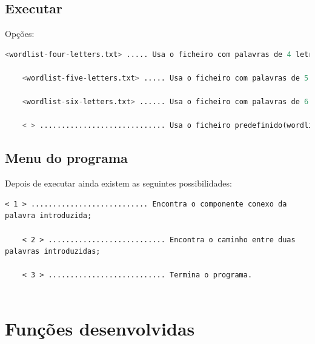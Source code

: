 	\section{Executar}
	\label{executar}
	Opções:
	\begin{lstlisting}[language=python]
	<wordlist-four-letters.txt> ..... Usa o ficheiro com palavras de 4 letras;
	
	<wordlist-five-letters.txt> ..... Usa o ficheiro com palavras de 5 letras;
	
	<wordlist-six-letters.txt> ...... Usa o ficheiro com palavras de 6 letras;
	
	< > ............................. Usa o ficheiro predefinido(wordlist-big-latest.txt).
	\end{lstlisting}
\pagebreak
	\section{Menu do programa}
	\label{menu}
	Depois de executar ainda existem as seguintes possibilidades:
	\begin{lstlisting}[]
	< 1 > ........................... Encontra o componente conexo da palavra introduzida;
	
	< 2 > ........................... Encontra o caminho entre duas palavras introduzidas;
	
	< 3 > ........................... Termina o programa.
	
	\end{lstlisting}

\chapter{Funções desenvolvidas}
\label{funções}
